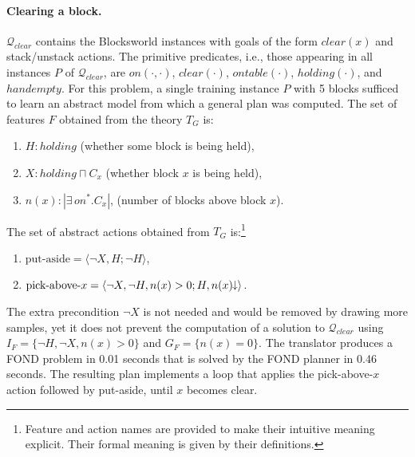 \documentclass[letterpaper]{article} %
\newcommand{\tup}[1]{\langle #1 \rangle}
\newcommand{\abs}[1]{\ensuremath{\left\vert{#1}\right\vert}}
\newcommand{\Q}{\mathcal{Q}}
\newcommand{\abst}[2]{\tup{#1;#2}}
\newcommand{\mminus}{\hspace{-.05em}\raisebox{.15ex}{\footnotesize$\downarrow$}}
\begin{document}


\paragraph{Clearing a block.}
$\Q_{clear}$ contains the Blocksworld instances  with goals of the form  $clear(x)$
and stack/unstack actions. The primitive predicates, i.e., those appearing in all instances $P$ of $\Q_{clear}$, 
are $on(\cdot,\cdot)$, $clear(\cdot)$,
$ontable(\cdot)$, $holding(\cdot)$, and $handempty$. 
For this problem, a  single training instance $P$  with  5 blocks
sufficed to learn an abstract model from which a general plan was computed.
The  set of  features $F$ obtained from the theory $T_G$ is:

\begin{enumerate}[--]
  \item $H: holding$ (whether some block is being held),
  \item $X: holding \sqcap C_x$ (whether block $x$ is being held),
  \item $n(x): \abs{\exists\,on^* . C_x}$, (number of blocks above block $x$).
\end{enumerate}

\noindent The set of abstract actions obtained from $T_G$ is:\footnote{
Feature and action names are provided   to make their intuitive meaning explicit.
Their formal meaning is given by their definitions.}

\begin{enumerate}[--]
  \item $\text{put-aside} = \abst{\neg X, H}{\neg H}$,
  \item $\text{pick-above-$x$} = \abst{\neg X, \neg H, n(x) > 0}{H, n(x)\mminus}$.
\end{enumerate}

The extra precondition $\neg X$ is not needed and would  be removed by drawing more samples,
yet it does not prevent the computation of a solution to $\Q_{clear}$ using  $I_F = \{\neg H, \neg X, n(x) > 0\}$ and $G_F=\{n(x)=0\}$.
The translator produces a FOND problem in 0.01 seconds that is solved
by the FOND  planner in 0.46 seconds. The resulting plan implements  a loop that applies
the pick-above-$x$ action followed by put-aside,  until $x$ becomes clear. 
\end{document}
